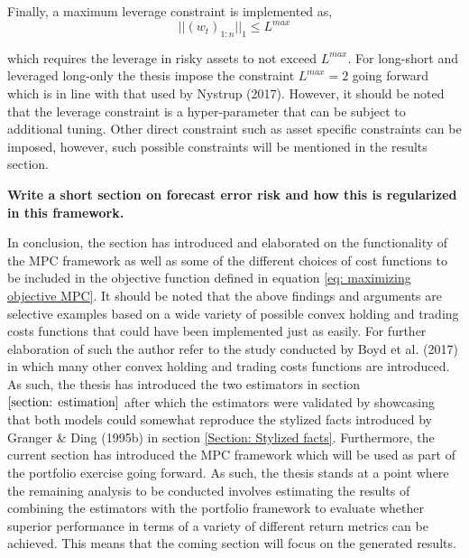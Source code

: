 Finally, a maximum leverage constraint is implemented as,
\begin{equation}
    || (w_t)_{1:n} ||_1 \leq L^{max}
\end{equation}

which requires the leverage in risky assets to not exceed $L^{max}$. For long-short and leveraged long-only the thesis impose the constraint $L^{max}=2$ going forward which is in line with that used by Nystrup (2017). However, it should be noted that the leverage constraint is a hyper-parameter that can be subject to additional tuning. Other direct constraint such as asset specific constraints can be imposed, however, such possible constraints will be mentioned in the results section.


\textbf{Write a short section on forecast error risk and how this is regularized in this framework.}

In conclusion, the section has introduced and elaborated on the functionality of the MPC framework as well as some of the different choices of cost functions to be included in the objective function defined in equation \ref{eq: maximizing objective MPC}. It should be noted that the above findings and arguments are selective examples based on a wide variety of possible convex holding and trading costs functions that could have been implemented just as easily. For further elaboration of such the author refer to the study conducted by Boyd et al. (2017) in which many other convex holding and trading costs functions are introduced. As such, the thesis has introduced the two estimators in section $\ref{section: estimation}$ after which the estimators were validated by showcasing that both models could somewhat reproduce the stylized facts introduced by Granger \& Ding (1995b) in section \ref{Section: Stylized facts}. Furthermore, the current section has introduced the MPC framework which will be used as part of the portfolio exercise going forward. As such, the thesis stands at a point where the remaining analysis to be conducted involves estimating the results of combining the estimators with the portfolio framework to evaluate whether superior performance in terms of a variety of different return metrics can be achieved. This means that the coming section will focus on the generated results. 